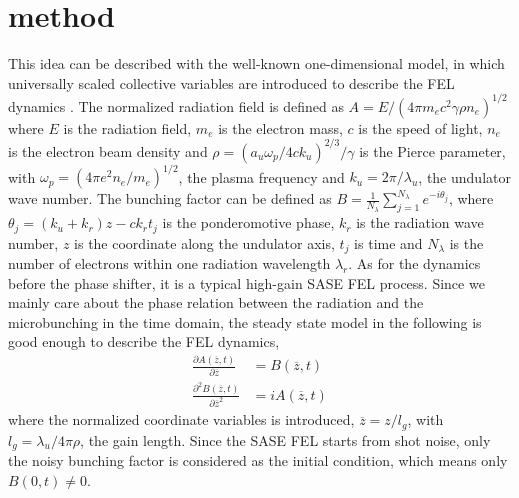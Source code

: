 \documentclass[%
 preprint,
 amsmath,amssymb,
 aps,
 prl,
 superscriptaddress,
 floatfix,
 letter,
]{revtex4-1}
\begin{document}
 \section{method}
This idea can be described with the well-known one-dimensional model, in which universally scaled collective variables are introduced to describe the FEL dynamics \cite{bonifacio1984}. The normalized radiation field is defined as $A=E/(4\pi m_ec^{2} \gamma \rho n_{e})^{1/2}$ where $E$ is the radiation field, $m_e$ is the electron mass, $c$ is the speed of light, $n_{e}$ is the electron beam density and $\rho=(a_{u}\omega_{p}/4ck_{u})^{2/3}/{\gamma}$ is the Pierce parameter, with $\omega_{p}=(4\pi e^{2}n_{e}/m_e)^{1/2}$, the plasma frequency and $k_{u}=2\pi/\lambda_{u}$, the undulator wave number. The bunching factor can be defined as  $B=\frac{1}{N_{\lambda}}\sum_{j=1}^{N_{\lambda}} e^{-i\theta_{j}} $, where $\theta_{j}=(k_{u}+k_{r})z-ck_{r}t_{j}$ is the ponderomotive phase, $k_{r}$ is the radiation wave number, $z$ is the coordinate along the undulator axis, $t_{j}$ is time and $N_{\lambda}$ is the number of electrons within one radiation wavelength $\lambda_{r}$. As for the dynamics before the phase shifter, it is a typical high-gain SASE FEL process. Since we mainly care about the phase relation between the radiation and the microbunching in the time domain, the steady state model in the following is good enough to describe the FEL dynamics,
\begin{equation}\label{Eq1}
\begin{split}
\frac{\partial A(\overline{z},t)}{\partial \overline{z}}&=B(\overline{z},t) \\
\frac{\partial^{2} B(\overline{z},t)}{\partial \overline{z}^{2}}&=iA(\overline{z},t)
\end{split}
\end{equation}
where the normalized coordinate variables is introduced, $\overline{z}=z/l_{g}$, with $l_{g}=\lambda_{u} /4\pi\rho$, the gain length. Since the SASE FEL starts from shot noise, only the noisy bunching factor is considered as the initial condition, which means only $B(0,t)\neq0$. 
\end{document}

